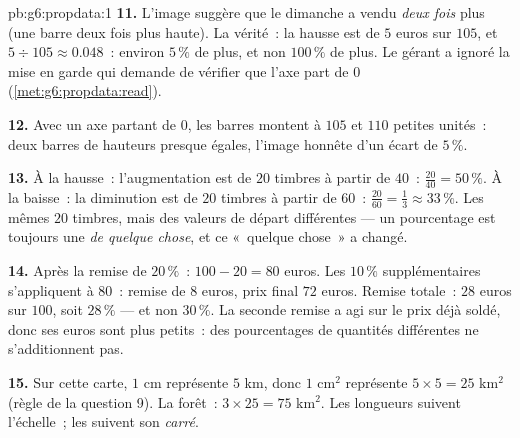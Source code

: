 \begin{solution}{pb:g6:propdata:1}
\textbf{11.} L'image suggère que le dimanche a vendu \emph{deux
fois} plus (une barre deux fois plus haute). La vérité~: la hausse
est de $5$ euros sur $105$, et $5 \div 105 \approx 0.048$~: environ
$5\,\%$ de plus, et non $100\,\%$ de plus. Le gérant a ignoré la
mise en garde qui demande de vérifier que l'axe part de $0$
(\cref{met:g6:propdata:read}).

\textbf{12.} Avec un axe partant de $0$, les barres montent à $105$
et $110$ petites unités~: deux barres de hauteurs presque égales,
l'image honnête d'un écart de $5\,\%$.

\textbf{13.} À la hausse~: l'augmentation est de $20$ timbres à
partir de $40$~: $\frac{20}{40} = 50\,\%$. À la baisse~: la
diminution est de $20$ timbres à partir de $60$~:
$\frac{20}{60} = \frac13 \approx 33\,\%$. Les mêmes $20$ timbres,
mais des valeurs de départ différentes --- un pourcentage est
toujours une  \emph{de quelque chose}, et ce «~quelque
chose~» a changé.

\textbf{14.} Après la remise de $20\,\%$~: $100 - 20 = 80$ euros.
Les $10\,\%$ supplémentaires s'appliquent à $80$~: remise de $8$
euros, prix final $72$ euros. Remise totale~: $28$ euros sur $100$,
soit $28\,\%$ --- et non $30\,\%$. La seconde remise a agi sur le
prix déjà soldé, donc ses euros sont plus petits~: des pourcentages
de quantités différentes ne s'additionnent pas.

\textbf{15.} Sur cette carte, $1$ cm représente $5$ km, donc $1$
cm$^2$ représente $5 \times 5 = 25$ km$^2$ (règle de la question 9).
La forêt~: $3 \times 25 = 75$ km$^2$. Les longueurs suivent
l'échelle~; les  suivent son \emph{carré}.
\end{solution}
